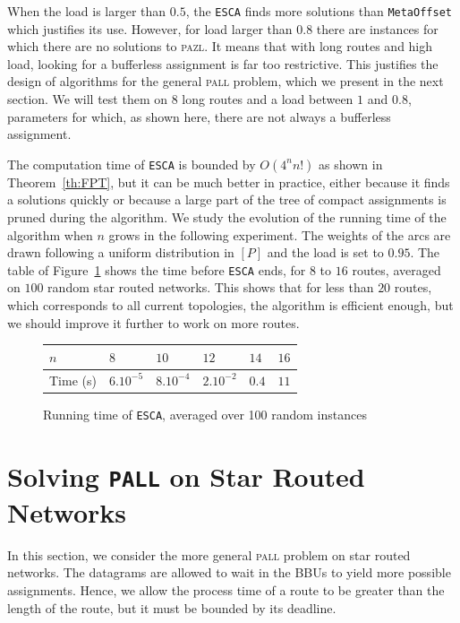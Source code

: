 \documentclass[a4paper,10pt]{journal}
\newcommand\metaoffset{\texttt{MetaOffset}\xspace}
\newcommand\ESCA{\texttt{ESCA}\xspace}
\newcommand\pazl{\textsc{pazl}\xspace}
\newcommand\pall{\textsc{pall}\xspace}
\begin{document}
       When the load is larger than $0.5$, the \ESCA finds more solutions than \metaoffset which justifies its use. However, for load larger than $0.8$ there are instances for which there are no solutions to \pazl. It means that with long routes and high load, looking for a bufferless assignment is far too restrictive. This justifies the design of algorithms for the general \pall problem, which we present in the next section. We will test them on $8$ long routes and a load between $1$ and $0.8$, parameters for which, as shown here, there are not always a bufferless assignment.
      
       The computation time of \ESCA is bounded by $O(4^nn!)$ as shown in Theorem~\ref{th:FPT}, but it can be much better in practice, either because it finds a solutions quickly or because a large part of the tree of compact assignments is pruned during the algorithm. We study the evolution of the running time  of the algorithm when $n$ grows in the following experiment. The weights of the arcs are drawn following a uniform distribution in $[P]$ and the load is set to $0.95$.  The table of Figure~\ref{fig:table} shows the time before \ESCA ends, for $8$ to $16$ routes, averaged on $100$ random star routed networks. This shows that for less than $20$ routes, which corresponds to all current topologies, the algorithm is efficient enough, but we should improve it further to work on more routes.
       
             \begin{figure}[h]
         \begin{center}
         \begin{tabularx}{0.9\textwidth}{|l|X|X|X|X|X|}
    \hline
   $n$ & $8$ & $10$& $12$&$14$& $16$\\
    \hline
   Time (s) & $6.10^{-5}$&$8.10^{-4}$&$2.10^{-2}$& $0.4$& $11$\\
    \hline
      \end{tabularx}
      \end{center}
      \caption{Running time of \ESCA, averaged over 100 random instances}
      \label{fig:table}
      \end{figure}
      
         \section{Solving \texttt{PALL} on Star Routed Networks}\label{sec:PALL}
    
    In this section, we consider the more general \pall problem on star routed networks. The datagrams are allowed to wait in the BBUs to yield more possible assignments. Hence, we allow the process time of a route to be greater than the length of the route, but it must be bounded by its deadline.
\end{document}
